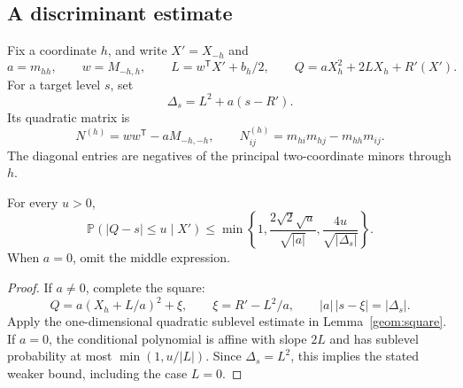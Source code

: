 \subsection{A discriminant estimate}

Fix a coordinate $h$, and write $X'=X_{-h}$ and
\[
 a=m_{hh},\qquad w=M_{-h,h},\qquad
 L=w^{\mathsf T}X'+b_h/2,\qquad
 Q=aX_h^2+2LX_h+R'(X').
\]
For a target level $s$, set
\begin{equation}\label{lower:delta}
 \Delta_s=L^2+a(s-R').
\end{equation}
Its quadratic matrix is
\begin{equation}\label{lower:minor-matrix}
 N^{(h)}=ww^{\mathsf T}-aM_{-h,-h},
 \qquad
 N^{(h)}_{ij}=m_{hi}m_{hj}-m_{hh}m_{ij}.
\end{equation}
The diagonal entries are negatives of the principal two-coordinate
minors through $h$.

\begin{lemma}\label{lower:conditional}
For every $u>0$,
\begin{equation}\label{lower:conditional-bound}
 \mathbb P(|Q-s|\leq u\mid X')
 \leq\min\left\{1,\frac{2\sqrt2\sqrt u}{\sqrt{|a|}},
                     \frac{4u}{\sqrt{|\Delta_s|}}\right\}.
\end{equation}
When $a=0$, omit the middle expression.
\end{lemma}
\begin{proof}
If $a\ne0$, complete the square:
\[
 Q=a(X_h+L/a)^2+\xi,
 \qquad \xi=R'-L^2/a,
 \qquad |a|\,|s-\xi|=|\Delta_s|.
\]
Apply the one-dimensional quadratic sublevel estimate in
Lemma~\ref{geom:square}.  If $a=0$, the conditional polynomial is
affine with slope $2L$ and has sublevel probability at most
$\min(1,u/|L|)$.  Since $\Delta_s=L^2$, this implies the stated
weaker bound, including the case $L=0$.
\end{proof}

